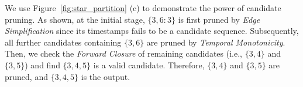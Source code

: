 \begin{example}
We use Figure~\ref{fig:star_partition} (c) to 
demonstrate the power of candidate pruning. 
As shown, at the initial stage, $\{3,6:3\}$ is first pruned by \textit{Edge Simplification} since its
timestamps fails to be a candidate sequence. Subsequently, all further candidates containing $\{3,6\}$ 
are pruned by \textit{Temporal Monotonicity}. Then, we check the \textit{Forward Closure} 
of remaining candidates (i.e., $\{3,4\}$ and $\{3,5\}$) and find $\{3,4,5\}$ is a
valid candidate. Therefore, $\{3,4\}$ and $\{3,5\}$ are pruned, and $\{3,4,5\}$ is the output.
\end{example}
%

